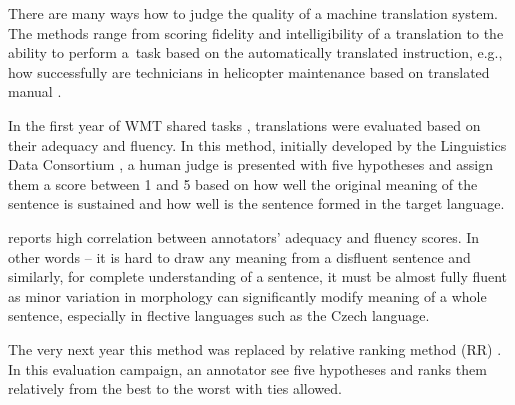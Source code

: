 There are many ways how to judge the quality of a machine translation system. 
The methods range from scoring fidelity and intelligibility of a translation to the ability to perform a~task based on the automatically translated instruction, e.g., how successfully are technicians in  helicopter maintenance based on translated manual \cite{Sinaiko}.

In the first year of WMT shared tasks \citep{koehn-monz:2006:WMT}, translations were evaluated based on their adequacy and fluency. 
In this method, initially  developed by the Linguistics Data Consortium ,  a human judge is presented with five hypotheses and assign them a score between 1 and 5 based on how well the original meaning of the sentence is sustained and how well is the sentence formed in the target language.

\cite{callison-burch-etal-2007-meta} reports high correlation between annotators’ adequacy and fluency scores. In other words -- it is hard to draw any meaning from a disfluent sentence and similarly, for complete understanding of a sentence, it must be almost fully fluent as minor variation in morphology can significantly modify meaning of a whole sentence, especially in flective languages such as the Czech language. 

The very next year this method was replaced by relative ranking method (RR) \citep{callison-burch-etal-2007-meta}. In this evaluation campaign, an annotator see five hypotheses and ranks them relatively from the best to the worst with ties allowed.


